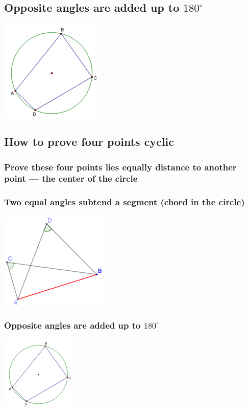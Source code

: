 \documentclass{article}
\begin{document}
\subsection{Opposite angles are added up to \(180^{\circ}\)}

\includegraphics[scale=.8]{Picture9.png}

\subsection{How to prove four points cyclic}

\subsubsection{Prove these four points lies equally distance to another point — the center of the circle}

\subsubsection{Two equal angles subtend a segment (chord in the circle)}

\includegraphics{Picture10.png}

\subsubsection{Opposite angles are added up to \(180^{\circ}\)}

\includegraphics{Picture11.png}
\end{document}
